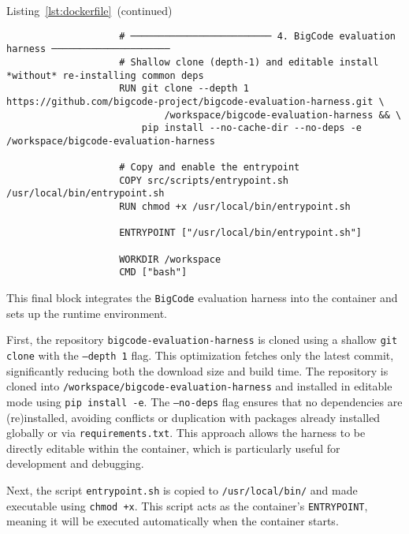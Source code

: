 \begin{minipage}{\textwidth}
	\captionsetup{type=listing}
	\caption*{Listing~\ref{lst:dockerfile}~(continued)}

	\begin{verbatim}
                    # ───────────────────────── 4. BigCode evaluation harness ─────────────────────
                    # Shallow clone (depth-1) and editable install *without* re-installing common deps
                    RUN git clone --depth 1 https://github.com/bigcode-project/bigcode-evaluation-harness.git \
                            /workspace/bigcode-evaluation-harness && \
                        pip install --no-cache-dir --no-deps -e /workspace/bigcode-evaluation-harness
                   
                    # Copy and enable the entrypoint
                    COPY src/scripts/entrypoint.sh /usr/local/bin/entrypoint.sh
                    RUN chmod +x /usr/local/bin/entrypoint.sh
                   
                    ENTRYPOINT ["/usr/local/bin/entrypoint.sh"]
                   
                    WORKDIR /workspace
                    CMD ["bash"]

    \end{verbatim}
\end{minipage}

This final block integrates the \texttt{BigCode} evaluation harness into the container and sets up the runtime environment.

First, the repository \texttt{bigcode-evaluation-harness} is cloned using a shallow \texttt{git clone} with the \texttt{--depth 1} flag. This optimization fetches only the latest commit, significantly reducing both the download size and build time. The repository is cloned into \texttt{/workspace/bigcode-evaluation-harness} and installed in editable mode using \texttt{pip install -e}. The \texttt{--no-deps} flag ensures that no dependencies are (re)installed, avoiding conflicts or duplication with packages already installed globally or via \texttt{requirements.txt}. This approach allows the harness to be directly editable within the container, which is particularly useful for development and debugging.

Next, the script \texttt{entrypoint.sh} is copied to \texttt{/usr/local/bin/} and made executable using \texttt{chmod +x}. This script acts as the container's \texttt{ENTRYPOINT}, meaning it will be executed automatically when the container starts.

